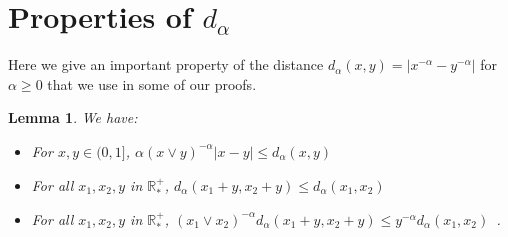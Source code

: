 \documentclass[11pt,a4paper]{article}
\newcommand{\RRP}{\mathbb{R}^+_*}
\newtheorem{lemma}[theorem]{Lemma}
\begin{document}
\section{Properties of $d_\alpha$}
Here we give an important property of the distance $d_\alpha(x,y) = |x^{-\alpha} - y^{-\alpha}|$ for $\alpha \geq 0$ that we use in some of our proofs.
\begin{lemma}\label{lem:properties-of-d-alpha}
    We have:
    \begin{itemize}
        \item For $x,y \in (0,1]$, $\alpha(x \vee y)^{-\alpha}|x - y| \leq d_\alpha(x,y)$
        \item For all $x_1,x_2, y$ in $\RRP$, $d_\alpha(x_1 + y,x_2 + y) \leq d_\alpha(x_1,x_2)$
        \item For all $x_1,x_2, y$ in $\RRP$, $(x_1 \vee x_2)^{-\alpha} d_\alpha(x_1 + y,x_2 + y) \leq y^{-\alpha} d_\alpha(x_1,x_2)$\ .
    \end{itemize}
\end{lemma}
\end{document}
